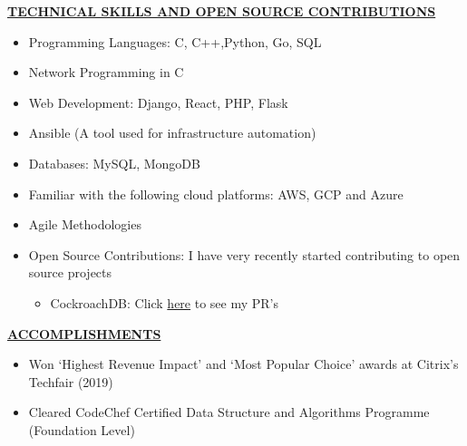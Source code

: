 \documentclass{article}
\begin{document}
\noindent \textbf{\underline{TECHNICAL SKILLS AND OPEN SOURCE CONTRIBUTIONS}}
\begin{itemize}[noitemsep,nolistsep,leftmargin=*]
\item {Programming Languages: C, C++,Python, Go, SQL}
\item {Network Programming in C}
\item {Web Development: Django, React, PHP, Flask}
\item {Ansible (A tool used for infrastructure automation)}
\item {Databases: MySQL, MongoDB}
\item {Familiar with the following cloud platforms: AWS, GCP and Azure}
\item {Agile Methodologies}
\item {Open Source Contributions: I have very recently started contributing to open source projects}
\begin{itemize}
    \item CockroachDB: Click \href{https://github.com/cockroachdb/cockroach/pulls?q=is\%3Apr+author\%3Abiradarganesh25+}{here} to see my PR's \\
\end{itemize}
\end{itemize}

\noindent \textbf{\underline{ACCOMPLISHMENTS}}
\begin{itemize}[noitemsep,nolistsep,leftmargin=*]
\item {Won ‘Highest Revenue Impact’ and ‘Most Popular Choice’ awards at Citrix's Techfair (2019)} 
\item {Cleared CodeChef Certified Data Structure and Algorithms Programme (Foundation Level) \\}
\end{itemize}

%
%
\end{document}
